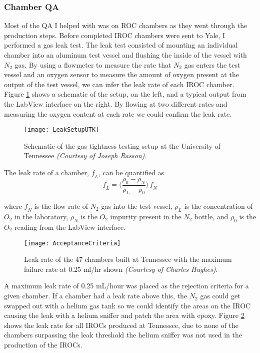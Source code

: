 \subsubsection{Chamber QA}

Most of the QA I helped with was on ROC chambers as they went through the production steps.  Before completed IROC chambers were sent to Yale, I performed a gas leak test.  The leak test consisted of mounting an individual chamber into an aluminum test vessel and flushing the inside of the vessel with $N_{2}$ gas.  By using a flowmeter to measure the rate that $N_{2}$ gas enters the test vessel and an oxygen sensor to measure the amount of oxygen present at the output of the test vessel, we can infer the leak rate of each IROC chamber.  Figure \ref{fig:LeakTest} shows a schematic of the setup, on the left, and a typical output from the LabView interface on the right.  By flowing at two different rates and measuring the oxygen content at each rate we could confirm the leak rate.

\begin{figure}[h]
\texttt{[image: LeakSetupUTK]}
\centering
\caption{Schematic of the gas tightness testing setup at the University of Tennessee \textit{(Courtesy of Joseph Rasson)}. }
\label{fig:LeakTest}
\end{figure}


The leak rate of a chamber, $\mathit{f_{L}}$,  can be quantified as
\begin{equation}
\mathit{f_{L}} =\Bigg(  \frac{\rho_{0} -\rho_{N}}{\rho_{L} -\rho_{0}} \Bigg) \,  \mathit{f_{N}}
\label{eq:leakrate}
\end{equation}

\noindent
where $\mathit{f_{N}}$ is the flow rate of $N_{2}$ gas into the test vessel, $\rho_{L}$ is the concentration of $O_{2}$ in the laboratory, $\rho_{N}$ is the $O_{2}$ impurity present in the $N_{2}$ bottle, and $\rho_{0}$ is the $O_{2}$ reading from the LabView interface.  

\begin{figure}[h]
\texttt{[image: AcceptanceCriteria]}
\centering
\caption{Leak rate of the 47 chambers built at Tennessee with the maximum failure rate at 0.25 ml/hr shown \textit{(Courtesy of Charles Hughes)}. }
\label{fig:IROCLeaK}
\end{figure}


A maximum leak rate of 0.25 mL/hour was placed as the rejection criteria for a given chamber.  If a chamber had a leak rate above this, the $N_{2}$ gas could get swapped out with a helium gas tank so we could identify the areas on the IROC causing the leak with a helium sniffer and patch the area with epoxy.  Figure \ref{fig:IROCLeaK} shows the leak rate for all IROCs produced at Tennessee, due to none of the chambers surpassing the leak threshold the helium sniffer was not used in the production of the IROCs. 

